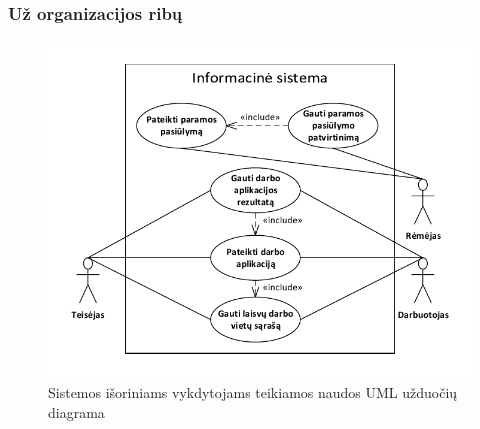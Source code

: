 \documentclass{VUMIFPSkursinis}
\begin{document}
    \subsubsection*{Už organizacijos ribų}
	
	    \begin{figure}[H]
			\centering
			\includegraphics[width=\textwidth]{img/IsPSI1ScenarijausUzduociuDiagrama2}
			\caption{Sistemos išoriniams vykdytojams teikiamos naudos UML užduočių diagrama}
			\label{fig:scenarijusIsoresVykdytojuUzduociuDiagrama}
		\end{figure}
\end{document}
